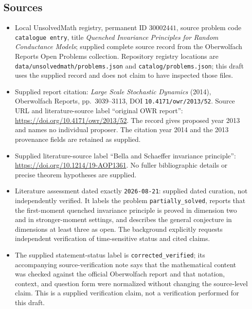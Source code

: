\documentclass[11pt]{article}
\begin{document}
\subsection{Sources}
\begin{itemize}
\item Local UnsolvedMath registry, permanent ID \(30002441\), source problem code \texttt{catalogue entry}, title \emph{Quenched Invariance Principles for Random Conductance Models}; supplied complete source record from the Oberwolfach Reports Open Problems collection. Repository registry locations are \texttt{data/unsolvedmath/problems.json} and \texttt{catalog/problems.json}; this draft uses the supplied record and does not claim to have inspected those files.
\item Supplied report citation: \emph{Large Scale Stochastic Dynamics} (2014), Oberwolfach Reports, pp.\ 3039--3113, DOI \texttt{10.4171/owr/2013/52}. Source URL and literature-source label ``original OWR report'': \url{https://doi.org/10.4171/owr/2013/52}. The record gives proposed year 2013 and names no individual proposer. The citation year 2014 and the 2013 provenance fields are retained as supplied.
\item Supplied literature-source label ``Bella and Schaeffer invariance principle'': \url{https://doi.org/10.1214/19-AOP1361}. No fuller bibliographic details or precise theorem hypotheses are supplied.
\item Literature assessment dated exactly \texttt{2026-08-21}: supplied dated curation, not independently verified. It labels the problem \texttt{partially\_solved}, reports that the first-moment quenched invariance principle is proved in dimension two and in stronger-moment settings, and describes the general conjecture in dimensions at least three as open. The background explicitly requests independent verification of time-sensitive status and cited claims.
\item The supplied statement-status label is \texttt{corrected\_verified}; its accompanying source-verification note says that the mathematical content was checked against the official Oberwolfach report and that notation, context, and question form were normalized without changing the source-level claim. This is a supplied verification claim, not a verification performed for this draft.
\end{itemize}
\end{document}
